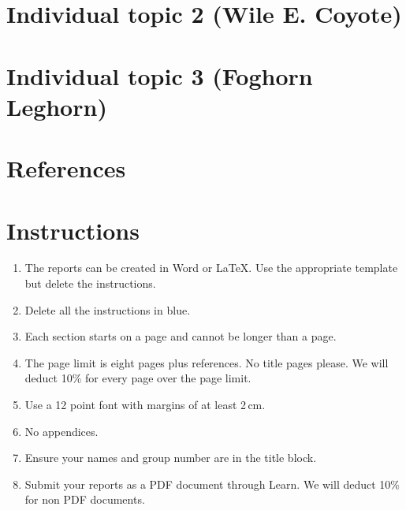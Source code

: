\documentclass[a4paper,12pt]{article}
\begin{document}
\section{Individual topic 2 (Wile E. Coyote)}


\section{Individual topic 3 (Foghorn Leghorn)}


\section{References}


\color{blue}
\section*{Instructions}

\begin{enumerate}
\item The reports can be created in Word or \LaTeX.  Use the
  appropriate template but delete the instructions.

\item Delete all the instructions in blue.

\item Each section starts on a page and cannot be longer than a page.

\item The page limit is eight pages plus references.  No title pages
  please.  We will deduct 10\% for every page over the page limit.

\item Use a 12 point font with margins of at least 2\,cm.

\item No appendices.

\item Ensure your names and group number are in the title block.

\item Submit your reports as a PDF document through Learn.  We will
  deduct 10\% for non PDF documents.
\end{enumerate}
\end{document}
